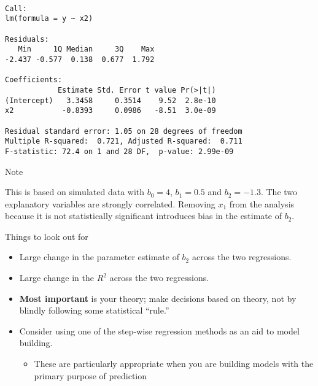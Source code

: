 \documentclass[10pt,ignorenonframetext,]{beamer}
\providecommand{\tightlist}{%
\setlength{\itemsep}{0pt}\setlength{\parskip}{0pt}}
\begin{document}
\begin{frame}[fragile]

\begin{verbatim}

Call:
lm(formula = y ~ x2)

Residuals:
   Min     1Q Median     3Q    Max
-2.437 -0.577  0.138  0.677  1.792

Coefficients:
            Estimate Std. Error t value Pr(>|t|)
(Intercept)   3.3458     0.3514    9.52  2.8e-10
x2           -0.8393     0.0986   -8.51  3.0e-09

Residual standard error: 1.05 on 28 degrees of freedom
Multiple R-squared:  0.721, Adjusted R-squared:  0.711
F-statistic: 72.4 on 1 and 28 DF,  p-value: 2.99e-09
\end{verbatim}

\end{frame}

\begin{frame}{Note}

This is based on simulated data with \(b_0=4\), \(b_1=0.5\) and
\(b_2 = -1.3\). The two explanatory variables are strongly correlated.
Removing \(x_1\) from the analysis because it is not statistically
significant introduces bias in the estimate of \(b_2\).

\end{frame}

\begin{frame}{Things to look out for}

\begin{itemize}
\tightlist
\item
  Large change in the parameter estimate of \(b_2\) across the two
  regressions.
\item
  Large change in the \(R^2\) across the two regressions.
\item
  \textbf{Most important} is your theory; make decisions based on
  theory, not by blindly following some statistical ``rule.''
\item
  Consider using one of the step-wise regression methods as an aid to
  model building.

  \begin{itemize}
  \tightlist
  \item
    These are particularly appropriate when you are building models with
    the primary purpose of prediction
  \end{itemize}
\end{itemize}

\end{frame}
\end{document}
